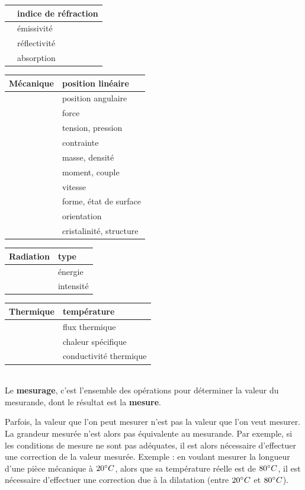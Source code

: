 \begin {center}
\begin{tabular}{|p{3cm}|p{7cm}|}
\hline
 & 	indice de réfraction \\
\hline
 & 	émissivité \\
\hline
 & 	réflectivité \\
\hline
 & 	absorption \\
\hline
\end{tabular}
\begin{tabular}{|p{3cm}|p{7cm}|}
Mécanique &	position linéaire \\
\hline
 & 	position angulaire \\
\hline
 & 	force \\
\hline
 & 	tension, pression \\
\hline
 & 	contrainte \\
\hline
 & 	masse, densité \\
\hline
 & 	moment, couple \\
\hline
 & 	vitesse \\
\hline
 & 	forme, état de surface \\
\hline
 & 	orientation \\
\hline
 & 	cristalinité, structure \\
\hline
\end{tabular}
\begin{tabular}{|p{3cm}|p{7cm}|}
Radiation &	type \\
\hline
 & 	énergie \\
\hline
 & 	intensité \\
\hline
\end{tabular}
\begin{tabular}{|p{3cm}|p{7cm}|}
Thermique &	température \\
\hline
 & 	flux thermique \\
\hline
 & 	chaleur spécifique \\
\hline
 & 	conductivité thermique \\
\hline
\end{tabular}
\end{center}
~\\

Le \textbf{mesurage}, c'est l'ensemble des opérations pour déterminer la valeur du mesurande, dont le résultat est la \textbf{mesure}.

Parfois, la valeur que l'on peut mesurer n'est pas la valeur que l'on veut mesurer. La grandeur mesurée n'est alors pas équivalente au mesurande. Par exemple, si les conditions de mesure ne sont pas adéquates, il est alors nécessaire d'effectuer une correction de la valeur mesurée. Exemple : en voulant mesurer la longueur d'une pièce mécanique à $20 \degree C$, alors que sa température réelle est de $80 \degree C$, il est nécessaire d'effectuer une correction due à la dilatation (entre $20 \degree C$ et $80 \degree C$).

